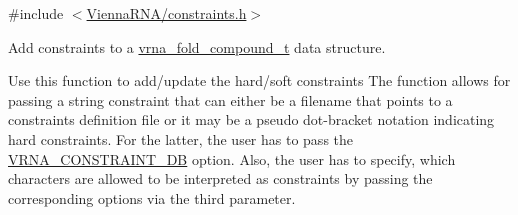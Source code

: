 {\ttfamily \#include $<$\hyperlink{constraints_8h}{Vienna\+R\+N\+A/constraints.\+h}$>$}



Add constraints to a \hyperlink{group__fold__compound_ga1b0cef17fd40466cef5968eaeeff6166}{vrna\+\_\+fold\+\_\+compound\+\_\+t} data structure. 

Use this function to add/update the hard/soft constraints The function allows for passing a string \textquotesingle{}constraint\textquotesingle{} that can either be a filename that points to a constraints definition file or it may be a pseudo dot-\/bracket notation indicating hard constraints. For the latter, the user has to pass the \hyperlink{group__hard__constraints_ga4bfc2f15c4f261c62a11af9d2aa80c90}{V\+R\+N\+A\+\_\+\+C\+O\+N\+S\+T\+R\+A\+I\+N\+T\+\_\+\+DB} option. Also, the user has to specify, which characters are allowed to be interpreted as constraints by passing the corresponding options via the third parameter.

